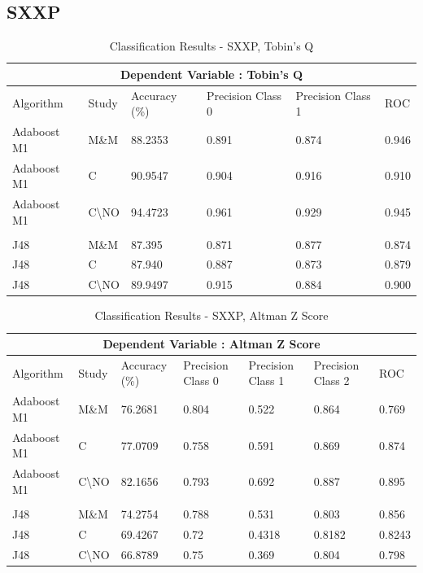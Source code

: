 \clearpage
\subsection*{SXXP}
\begin{table}[h!]
\centering
\begin{tabular}{ |p{2.5cm}|p{2cm}||p{2.5cm}|p{2cm}|p{2cm}|p{1cm}|  }
 \hline
 \multicolumn{6}{|c|}{Dependent Variable : Tobin's Q} \\
 \hline
 Algorithm & Study & Accuracy (\%) & Precision Class 0 & Precision Class 1 & ROC \\
 \hline
  Adaboost M1  & M\&M &  88.2353     & 0.891 &  0.874 & 0.946  \\
 Adaboost M1 & C &  90.9547 & 0.904 & 0.916  & 0.910  \\
  Adaboost M1 & C\textbackslash NO & 94.4723  & 0.961 & 0.929 & 0.945 \\
 & & & & & \\
 J48  & M\&M & 87.395  & 0.871 &  0.877 & 0.874  \\
 J48  & C &  87.940 & 0.887 &  0.873 &  0.879 \\
 J48 & C\textbackslash NO & 89.9497  & 0.915 & 0.884 & 0.900 \\
 \hline
\end{tabular}
\caption{Classification Results - SXXP, Tobin's Q}
\end{table}

\begin{table}[h]
\begin{tabular}{ |p{2.5cm}|p{1.5cm}||p{2.5cm}|p{1.6cm}|p{1.6cm}|p{1.6cm}|p{1cm}|  }
 \hline
 \multicolumn{7}{|c|}{Dependent Variable : Altman Z Score} \\
 \hline
 Algorithm & Study & Accuracy (\%) & Precision Class 0 & Precision Class 1 & Precision Class 2 & ROC \\
 \hline
Adaboost M1  & M\&M &  76.2681  & 0.804 &  0.522 & 0.864 & 0.769  \\
 Adaboost M1 & C & 77.0709 & 0.758 & 0.591 &  0.869 & 0.874  \\
  Adaboost M1 & C\textbackslash NO & 82.1656 & 0.793 & 0.692  & 0.887 & 0.895  \\
  & & & & & &\\
 J48  & M\&M & 74.2754  & 0.788 &  0.531 & 0.803 & 0.856  \\
 J48 & C & 69.4267 & 0.72 & 0.4318 & 0.8182  & 0.8243  \\
 J48  & C\textbackslash NO & 66.8789 & 0.75 & 0.369  & 0.804 & 0.798  \\
 \hline
\end{tabular}
\caption{Classification Results  - SXXP, Altman Z Score}
\end{table}



